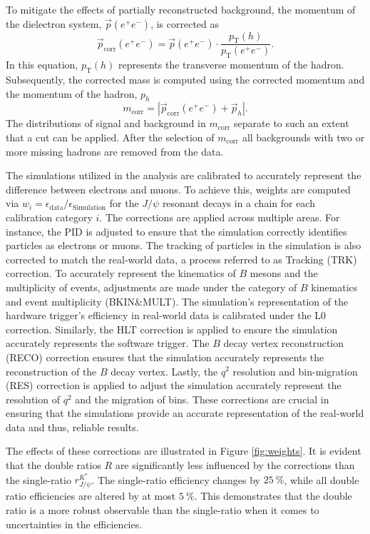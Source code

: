 To mitigate the effects of partially reconstructed background, the momentum of the 
dielectron system, $\vec{p}(e^+e^-)$, is corrected as
\begin{equation}
    \vec{p}_\text{corr}(e^+e^-)=\vec{p}(e^+e^-)\cdot\frac{p_\text{T}(h)}{p_\text{T}(e^+e^-)}.
\end{equation}
In this equation, $p_\text{T}(h)$ represents the transverse momentum of the hadron. 
Subsequently, the corrected mass is computed using the corrected momentum and the 
momentum of the hadron, $p_h$
\begin{equation}
    m_\text{corr}=|\vec{p}_\text{corr}(e^+e^-)+\vec{p}_h|.
\end{equation}
The distributions of signal and background in $m_\text{corr}$ separate to such an extent 
that a cut can be applied. After the selection of $m_\text{corr}$ all backgrounds with two 
or more missing hadrons are removed from the data.

The simulations utilized in the analysis are calibrated to accurately represent the difference 
between electrons and muons. To achieve this, weights are computed via 
$w_i=\epsilon_\text{data}/\epsilon_\text{Simulation}$ for the $J\!/\!\psi$ resonant decays in a chain 
for each calibration category $i$. 
The corrections are applied across multiple areas. For instance, the PID is adjusted to ensure 
that the simulation correctly identifies particles as electrons or muons. The tracking of 
particles in the simulation is also corrected to match the real-world data, a process referred 
to as Tracking (TRK) correction.
To accurately represent the kinematics of $B$ mesons and the multiplicity of events, adjustments 
are made under the category of $B$ kinematics and event multiplicity (BKIN\&MULT). The simulation's
representation of the hardware trigger's efficiency in real-world data is calibrated under the 
L0 correction.
Similarly, the HLT correction is applied to ensure the simulation accurately represents the software 
trigger. The $B$ decay vertex reconstruction (RECO) correction ensures that the simulation accurately 
represents the reconstruction of the $B$ decay vertex.
Lastly, the $q^2$ resolution and bin-migration (RES) correction is applied to adjust the simulation 
accurately represent the resolution of $q^2$ and the migration of bins. These corrections are crucial 
in ensuring that the simulations provide an accurate representation of the real-world data and thus, 
reliable results.

The effects of these corrections are illustrated in Figure \ref{fig:weights}. 
It is evident that the double ratios $R$ are significantly less influenced by the corrections 
than the single-ratio $r^{K^*}_{J\!/\!\psi}$. The single-ratio efficiency changes by $\SI{25}{\%}$, 
while all double ratio efficiencies are altered by at most $\SI{5}{\%}$. This demonstrates that 
the double ratio is a more robust observable than the single-ratio when it comes to uncertainties 
in the efficiencies.

